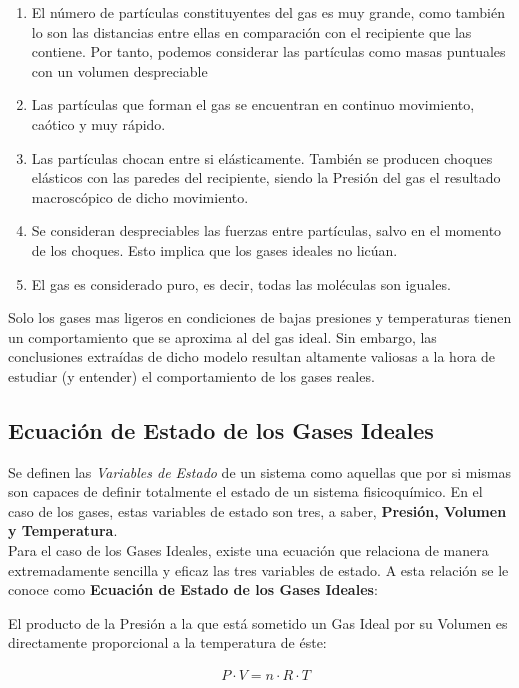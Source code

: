 \begin{enumerate}
	\item El número de partículas constituyentes del gas es muy grande, como también lo son las distancias entre ellas en comparación con el recipiente que las contiene. Por tanto, podemos considerar las partículas como masas puntuales con un volumen despreciable\\
	\item Las partículas que forman el gas se encuentran en continuo movimiento, caótico y muy rápido.\\
	\item Las partículas chocan entre si elásticamente. También se producen choques elásticos con las paredes del recipiente, siendo la Presión del gas el resultado macroscópico de dicho movimiento.\\
	\item Se consideran despreciables las fuerzas entre partículas, salvo en el momento de los choques. Esto implica que los gases ideales no licúan.\\
	\item El gas es considerado puro, es decir, todas las moléculas son iguales.\\
\end{enumerate}

Solo los gases mas ligeros en condiciones de bajas presiones y temperaturas tienen un comportamiento que se aproxima al del gas ideal. Sin embargo, las conclusiones extraídas de dicho modelo resultan altamente valiosas a la hora de estudiar (y entender) el comportamiento de los gases reales.

\subsection{Ecuación de Estado de los Gases Ideales}

Se definen las \emph{Variables de Estado} de un sistema como aquellas que por si mismas son capaces de definir totalmente el estado de un sistema fisicoquímico. En el caso de los gases, estas variables de estado son tres, a saber, \textbf{Presión, Volumen y Temperatura}.\\

Para el caso de los Gases Ideales, existe una ecuación que relaciona de manera extremadamente sencilla y eficaz las tres variables de estado. A esta relación se le conoce como \textbf{Ecuación de Estado de los Gases Ideales}:

\begin{definition}
	El producto de la Presión a la que está sometido un Gas Ideal por su Volumen es directamente proporcional a la temperatura de éste:
	
	\begin{align}
		& P\cdot V = n\cdot R \cdot T
	\end{align}
	
\end{definition}

